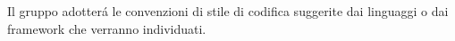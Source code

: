 Il gruppo \Gruppo{} adotter\'{a} le convenzioni di stile di codifica suggerite dai linguaggi o dai framework che verranno individuati.